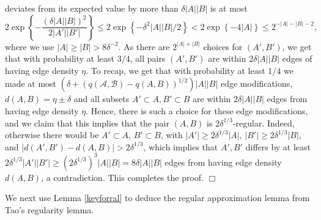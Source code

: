 \documentclass[11pt]{article}
\newenvironment{proof}
      {\medskip\noindent{\bf Proof:}\hspace{1mm}}
      {\hfill$\Box$\medskip}
\begin{document}
\begin{proof}
deviates from its expected value by more than $\delta |A||B|$ is at most
$$2 \exp\left\{
      -\frac{(\delta |A||B|)^2}{2|A'||B'|}
    \right\} \leq 2\exp\left\{-\delta^2|A||B|/2\right\}<2\exp\left\{-4|A|\right\}\leq 2^{-|A|-|B|-2},$$
where we use $|A| \geq |B| >8\delta^{-2}$.
As there are $2^{|A|+|B|}$ choices for $(A',B')$, we get that with probability at
least $3/4$, all pairs $(A', B')$ are within $2\delta |A||B|$ edges of having edge
density $\eta$. To recap, we get that with probability at least $1/4$ we made
at most
$\left(\delta+\left(q(\mathcal{A},\mathcal{B})-q(A,B)\right)^{1/2}\right)|A||B|$
edge modifications, $d(A, B) = \eta \pm \delta$ and all subsets $A' \subset
A,B' \subset B$ are within $2\delta |A||B|$ edges from having edge density $\eta$. Hence, 
there is such a choice for these edge modifications, and we claim that this implies that the pair $(A,B)$ is $2\delta^{1/3}$-regular. Indeed,
otherwise there would be $A' \subset A$, $B' \subset B$, with $|A'| \geq 2\delta^{1/3}|A|$, $|B'|\geq 2\delta^{1/3}|B|$, and $|d(A',B')-d(A,B)|>2\delta^{1/3}$, which implies that
$A',B'$ differs by at least $2\delta^{1/3}|A'||B'| \geq (2\delta^{1/3})^3|A||B|=8\delta |A||B|$  edges from
having edge density $d(A,B)$, a contradiction. This completes the proof. 
\end{proof}

We next use Lemma \ref{keyforral} to deduce the regular approximation lemma from Tao's regularity lemma.
\end{document}
